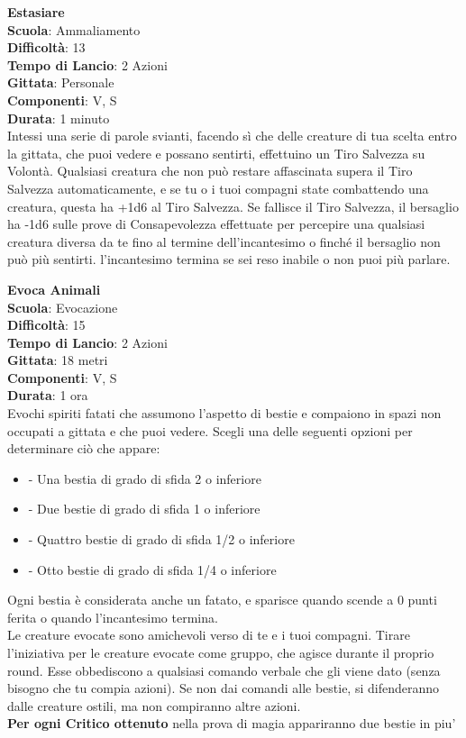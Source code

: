 \begin{multicols}{2}
\medskip\textbf{Estasiare}\\
\textbf{Scuola}: Ammaliamento\\
\textbf{Difficoltà}:  13\\
\textbf{Tempo di Lancio}: 2 Azioni\\
\textbf{Gittata}: Personale\\
\textbf{Componenti}: V, S\\
\textbf{Durata}: 1 minuto\\
Intessi una serie di parole svianti, facendo sì che delle creature di tua scelta entro la gittata, che puoi vedere e possano sentirti, effettuino un Tiro Salvezza su Volontà. Qualsiasi creatura che non può restare affascinata supera il Tiro Salvezza automaticamente, e se tu o i tuoi compagni state combattendo una creatura, questa ha +1d6 al Tiro Salvezza. Se fallisce il Tiro Salvezza, il bersaglio ha -1d6 sulle prove di Consapevolezza effettuate per percepire una qualsiasi creatura diversa da te fino al termine dell'incantesimo o finché il bersaglio non può più sentirti.
l'incantesimo termina se sei reso inabile o non puoi più parlare.

\medskip\textbf{Evoca Animali}\\
\textbf{Scuola}: Evocazione\\
\textbf{Difficoltà}:  15\\
\textbf{Tempo di Lancio}: 2 Azioni\\
\textbf{Gittata}: 18 metri\\
\textbf{Componenti}: V, S\\
\textbf{Durata}: 1 ora\\
Evochi spiriti fatati che assumono l’aspetto di bestie e compaiono in spazi non occupati a gittata e che puoi vedere. Scegli una delle seguenti opzioni per determinare ciò che appare:
\begin{itemize}
\item
- Una bestia di grado di sfida 2 o inferiore
\item
- Due bestie di grado di sfida 1 o inferiore
\item
- Quattro bestie di grado di sfida 1/2 o inferiore
\item
- Otto bestie di grado di sfida 1/4 o inferiore
\end{itemize}
\medskip
Ogni bestia è considerata anche un fatato, e sparisce quando scende a 0 punti ferita o quando l'incantesimo termina. \\
Le creature evocate sono amichevoli verso di te e i tuoi compagni. Tirare l’iniziativa per le creature evocate come gruppo, che agisce durante il proprio round. Esse obbediscono a qualsiasi comando verbale che gli viene dato (senza bisogno che tu compia azioni). Se non dai comandi alle bestie, si difenderanno dalle creature ostili, ma non compiranno altre azioni.\\
\textbf{Per ogni Critico ottenuto} nella prova di magia appariranno due bestie in piu'


\end{multicols}
